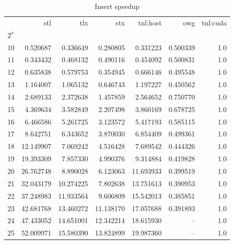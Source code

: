 \begin{table}
  \centering
  \begin{tabular}{lrrrrrr}
    \toprule
    {}    & stl       & tlx       & stx       & tnl:host  & owg      & tnl:cuda \\
    $2^x$ &           &           &           &           &          &          \\
    \midrule
    10    & 0.520687  & 0.336649  & 0.280805  & 0.331223  & 0.500339 & 1.0      \\
    11    & 0.343432  & 0.468132  & 0.490116  & 0.454092  & 0.500831 & 1.0      \\
    12    & 0.635838  & 0.579753  & 0.354945  & 0.666146  & 0.495548 & 1.0      \\
    13    & 1.164007  & 1.065132  & 0.646743  & 1.197227  & 0.450562 & 1.0      \\
    14    & 2.689133  & 2.372638  & 1.457859  & 2.564652  & 0.750770 & 1.0      \\
    15    & 4.369634  & 3.582849  & 2.207498  & 3.860169  & 0.678725 & 1.0      \\
    16    & 6.466586  & 5.261725  & 3.123572  & 5.417193  & 0.585115 & 1.0      \\
    17    & 8.642751  & 6.343652  & 3.870030  & 6.854409  & 0.499361 & 1.0      \\
    18    & 12.149907 & 7.069242  & 4.516428  & 7.689542  & 0.444326 & 1.0      \\
    19    & 19.393309 & 7.857330  & 4.990376  & 9.314884  & 0.419828 & 1.0      \\
    20    & 26.762748 & 8.890028  & 6.123063  & 11.693933 & 0.399519 & 1.0      \\
    21    & 32.043179 & 10.274225 & 7.802638  & 13.751613 & 0.390953 & 1.0      \\
    22    & 37.248983 & 11.933564 & 9.606809  & 15.542013 & 0.385851 & 1.0      \\
    23    & 42.681768 & 13.460272 & 11.138170 & 17.057688 & 0.391893 & 1.0      \\
    24    & 47.433052 & 14.651001 & 12.342214 & 18.615930 & --      & 1.0      \\
    25    & 52.009971 & 15.580390 & 13.824899 & 19.987360 & --      & 1.0      \\
    \bottomrule
  \end{tabular}
  \caption{Insert speedup}
  \label{table:insert-speedup}
\end{table}
